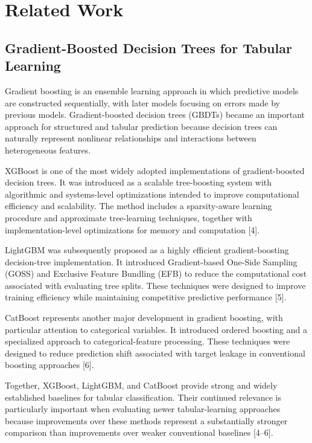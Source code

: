 \section{Related Work}\label{related-work}

\subsection{Gradient-Boosted Decision Trees for Tabular Learning}\label{gradient-boosted-decision-trees-for-tabular-learning}

Gradient boosting is an ensemble learning approach in which predictive models are constructed sequentially, with later models focusing on errors made by previous models. Gradient-boosted decision trees (GBDTs) became an important approach for structured and tabular prediction because decision trees can naturally represent nonlinear relationships and interactions between heterogeneous features.

XGBoost is one of the most widely adopted implementations of gradient-boosted decision trees. It was introduced as a scalable tree-boosting system with algorithmic and systems-level optimizations intended to improve computational efficiency and scalability. The method includes a sparsity-aware learning procedure and approximate tree-learning techniques, together with implementation-level optimizations for memory and computation {[}4{]}.

LightGBM was subsequently proposed as a highly efficient gradient-boosting decision-tree implementation. It introduced Gradient-based One-Side Sampling (GOSS) and Exclusive Feature Bundling (EFB) to reduce the computational cost associated with evaluating tree splits. These techniques were designed to improve training efficiency while maintaining competitive predictive performance {[}5{]}.

CatBoost represents another major development in gradient boosting, with particular attention to categorical variables. It introduced ordered boosting and a specialized approach to categorical-feature processing. These techniques were designed to reduce prediction shift associated with target leakage in conventional boosting approaches {[}6{]}.

Together, XGBoost, LightGBM, and CatBoost provide strong and widely established baselines for tabular classification. Their continued relevance is particularly important when evaluating newer tabular-learning approaches because improvements over these methods represent a substantially stronger comparison than improvements over weaker conventional baselines {[}4--6{]}.

